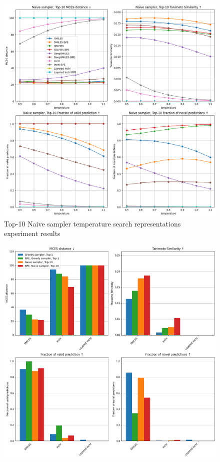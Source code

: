 \begin{figure}[h]
    \centering
    \includegraphics[width=1.0\textwidth]{figures/appendix/representations_with_layered_inchi_with_tanimoto.png}
    \caption{Top-10 Naive sampler temperature search representations experiment results}
    \label{fig:representations_appendix}
\end{figure}

\begin{figure}[h]
    \centering
    \includegraphics[width=1.0\textwidth]{figures/appendix/layered_inchi_with_tanimoto.png}
    \caption{}
    \label{fig:layered_inchi}
\end{figure}